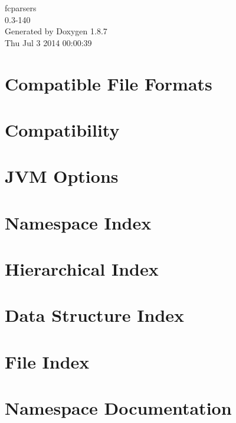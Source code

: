 \documentclass[twoside]{book}
\newcommand{\+}{\discretionary{\mbox{\scriptsize$\hookleftarrow$}}{}{}}
\newcommand{\clearemptydoublepage}{%
  \newpage{\pagestyle{empty}\cleardoublepage}%
}
\begin{document}
\begin{titlepage}
\vspace*{7cm}
\begin{center}%
{\Large fcparsers \\[1ex]\large 0.\+3-\/140 }\\
\vspace*{1cm}
{\large Generated by Doxygen 1.8.7}\\
\vspace*{0.5cm}
{\small Thu Jul 3 2014 00:00:39}\\
\end{center}
\end{titlepage}
\clearemptydoublepage
\tableofcontents
\clearemptydoublepage
{}

\chapter{Compatible File Formats}
\label{formats}

\chapter{Compatibility}
\label{Compatibility}

\chapter{J\+V\+M Options}
\label{jvmopt}

\chapter{Namespace Index}

\chapter{Hierarchical Index}

\chapter{Data Structure Index}

\chapter{File Index}

\chapter{Namespace Documentation}














\end{document}
